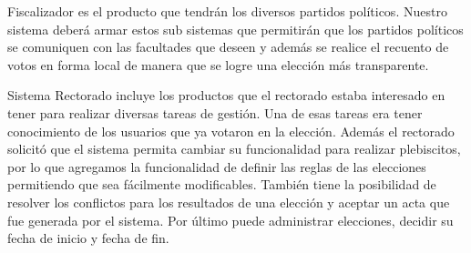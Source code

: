 Fiscalizador es el producto que tendrán los diversos partidos políticos. Nuestro sistema deberá armar estos sub sistemas que permitirán que los partidos políticos se comuniquen con las facultades que deseen y además se realice el recuento de votos en forma local de manera que se logre una elección más transparente. 
\\ \par
Sistema Rectorado incluye los productos que el rectorado estaba interesado en tener para realizar diversas tareas de gestión. Una de esas tareas era tener conocimiento de los usuarios que ya votaron en la elección. Además el rectorado solicitó que el sistema permita cambiar su funcionalidad para realizar plebiscitos, por lo que agregamos la funcionalidad de definir las reglas de las elecciones permitiendo que sea fácilmente modificables. También tiene la posibilidad de resolver los conflictos para los resultados de una elección y aceptar un acta que fue generada por el sistema. Por último puede administrar elecciones, decidir su fecha de inicio y fecha de fin.

